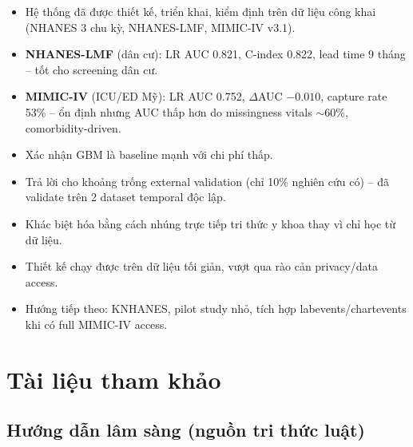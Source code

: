 \documentclass[13pt,a4paper]{article}
\begin{document}
\begin{itemize}
    \item Hệ thống đã được thiết kế, triển khai, kiểm định trên dữ liệu công khai (NHANES 3 chu kỳ, NHANES-LMF, MIMIC-IV v3.1).
    \item \textbf{NHANES-LMF} (dân cư): LR AUC 0.821, C-index 0.822, lead time 9 tháng -- tốt cho screening dân cư.
    \item \textbf{MIMIC-IV} (ICU/ED Mỹ): LR AUC 0.752, $\Delta$AUC $-0.010$, capture rate 53\% -- ổn định nhưng AUC thấp hơn do missingness vitals $\sim$60\%, comorbidity-driven.
    \item \cite{guo2024} Xác nhận GBM là baseline mạnh với chi phí thấp.
    \item \cite{swinckels2024} Trả lời cho khoảng trống external validation (chỉ 10\% nghiên cứu có) -- đã validate trên 2 dataset temporal độc lập.
    \item \cite{kraljevic2024,shmatko2025} Khác biệt hóa bằng cách nhúng trực tiếp tri thức y khoa thay vì chỉ học từ dữ liệu.
    \item \cite{shen2025} Thiết kế chạy được trên dữ liệu tối giản, vượt qua rào cản privacy/data access.
    \item Hướng tiếp theo: KNHANES, pilot study nhỏ, tích hợp labevents/chartevents khi có full MIMIC-IV access.
\end{itemize}

\section{Tài liệu tham khảo}

\subsection{Hướng dẫn lâm sàng (nguồn tri thức luật)}
\end{document}
